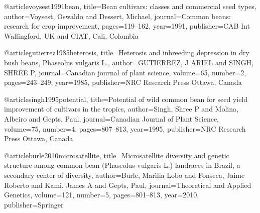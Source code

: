 @article{voysest1991bean,
  title={Bean cultivars: classes and commercial seed types},
  author={Voysest, Oswaldo and Dessert, Michael},
  journal={Common beans: research for crop improvement},
  pages={119--162},
  year={1991},
  publisher={CAB Int Wallingford, UK and CIAT, Cali, Colombia}
}

@article{gutierrez1985heterosis,
  title={Heterosis and inbreeding depression in dry bush beans, Phaseolus vulgaris L.},
  author={GUTIERREZ, J ARIEL and SINGH, SHREE P},
  journal={Canadian journal of plant science},
  volume={65},
  number={2},
  pages={243--249},
  year={1985},
  publisher={NRC Research Press Ottawa, Canada}
}

@article{singh1995potential,
  title={Potential of wild common bean for seed yield improvement of cultivars in the tropics},
  author={Singh, Shree P and Molina, Albeiro and Gepts, Paul},
  journal={Canadian Journal of Plant Science},
  volume={75},
  number={4},
  pages={807--813},
  year={1995},
  publisher={NRC Research Press Ottawa, Canada}
}

@article{burle2010microsatellite,
  title={Microsatellite diversity and genetic structure among common bean (Phaseolus vulgaris L.) landraces in Brazil, a secondary center of diversity},
  author={Burle, Mar{\'\i}lia Lobo and Fonseca, Jaime Roberto and Kami, James A and Gepts, Paul},
  journal={Theoretical and Applied Genetics},
  volume={121},
  number={5},
  pages={801--813},
  year={2010},
  publisher={Springer}
}

